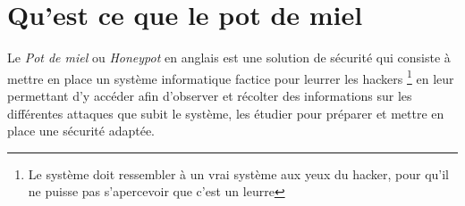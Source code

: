 \section{Qu'est ce que le pot de miel}
Le \emph{Pot de miel} ou \emph{Honeypot} en anglais est une solution de 
sécurité qui consiste
à mettre en place un système informatique factice pour leurrer 
les hackers \footnote{Le 
système doit ressembler à un vrai système aux yeux du hacker, 
pour qu'il ne puisse
pas s'apercevoir que c'est un leurre} en leur permettant d'y accéder afin
d'observer et récolter des informations sur
les différentes attaques que subit le système, les étudier pour  préparer
 et mettre en place une sécurité adaptée.
